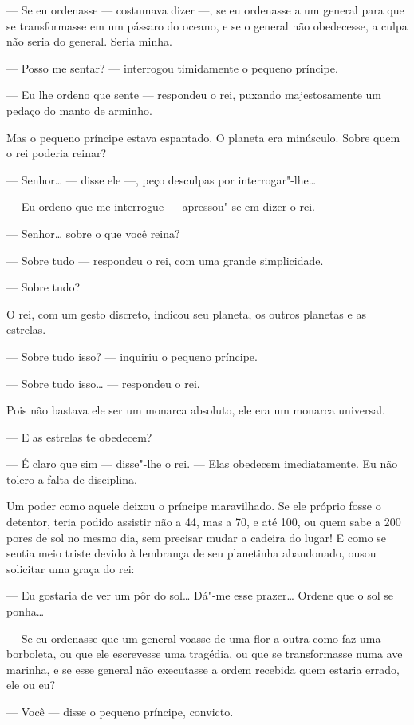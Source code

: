 \begin{Parallel}[p]{}{}
{--- Se eu ordenasse --- costumava dizer ---, se eu ordenasse a um general
para que se transformasse em um pássaro do oceano, e se o general não
obedecesse, a culpa não seria do general. Seria minha.

--- Posso me sentar? --- interrogou timidamente o pequeno príncipe.

--- Eu lhe ordeno que sente --- respondeu o rei, puxando majestosamente um
pedaço do manto de arminho.

Mas o pequeno príncipe estava espantado. O planeta era minúsculo. Sobre
quem o rei poderia reinar?

--- Senhor\ldots{} --- disse ele ---, peço desculpas por interrogar"-lhe\ldots{}

--- Eu ordeno que me interrogue --- apressou"-se em dizer o rei.

--- Senhor\ldots{} sobre o que você reina?

--- Sobre tudo --- respondeu o rei, com uma grande simplicidade.

--- Sobre tudo?

O rei, com um gesto discreto, indicou seu planeta, os outros planetas e
as estrelas.

--- Sobre tudo isso? --- inquiriu o pequeno príncipe.

--- Sobre tudo isso\ldots{} --- respondeu o rei.

Pois não bastava ele ser um monarca absoluto, ele era um monarca
universal.

--- E as estrelas te obedecem?

--- É claro que sim --- disse"-lhe o rei. --- Elas obedecem imediatamente. Eu
não tolero a falta de disciplina.

Um poder como aquele deixou o príncipe maravilhado. Se ele próprio fosse
o detentor, teria podido assistir não a 44, mas a 70, e até 100, ou quem
sabe a 200 pores de sol no mesmo dia, sem precisar mudar a cadeira do
lugar! E como se sentia meio triste devido à lembrança de seu planetinha
abandonado, ousou solicitar uma graça do rei:

--- Eu gostaria de ver um pôr do sol\ldots{} Dá"-me esse prazer\ldots{} Ordene que o
sol se ponha\ldots{}

--- Se eu ordenasse que um general voasse de uma flor a outra como faz uma
borboleta, ou que ele escrevesse uma tragédia, ou que se transformasse
numa ave marinha, e se esse general não executasse a ordem recebida quem
estaria errado, ele ou eu?

--- Você --- disse o pequeno príncipe, convicto.

}
\end{Parallel}
